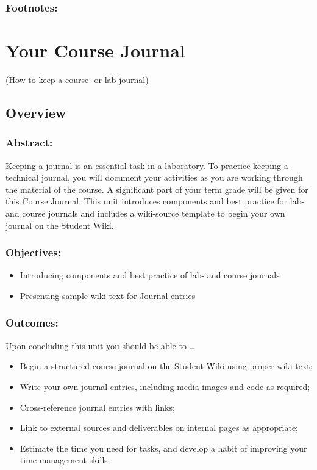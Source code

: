 \documentclass[]{book}
\providecommand{\tightlist}{%
  \setlength{\itemsep}{0pt}\setlength{\parskip}{0pt}}
\begin{document}
\subsection{Footnotes:}\label{footnotes}

\hypertarget{journal}{\chapter{Your Course Journal}\label{journal}}

(How to keep a course- or lab journal)

\section{Overview}\label{overview-1}

\subsection{Abstract:}\label{abstract-1}

Keeping a journal is an essential task in a laboratory. To practice
keeping a technical journal, you will document your activities as you
are working through the material of the course. A significant part of
your term grade will be given for this Course Journal. This unit
introduces components and best practice for lab- and course journals and
includes a wiki-source template to begin your own journal on the Student
Wiki.

\subsection{Objectives:}\label{objectives-1}

\begin{itemize}
\tightlist
\item
  Introducing components and best practice of lab- and course journals
\item
  Presenting sample wiki-text for Journal entries
\end{itemize}

\subsection{Outcomes:}\label{outcomes-1}

Upon concluding this unit you should be able to \ldots{}

\begin{itemize}
\tightlist
\item
  Begin a structured course journal on the Student Wiki using proper
  wiki text;
\item
  Write your own journal entries, including media images and code as
  required;
\item
  Cross-reference journal entries with links;
\item
  Link to external sources and deliverables on internal pages as
  appropriate;
\item
  Estimate the time you need for tasks, and develop a habit of improving
  your time-management skills.
\end{itemize}
\end{document}
